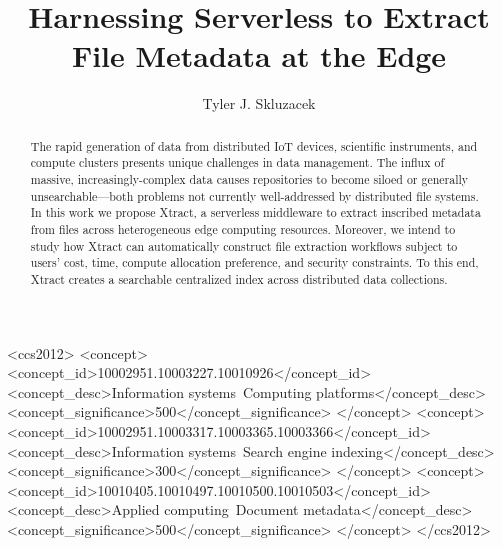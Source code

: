 \documentclass[sigconf, 9pt]{acmart}
\newcommand{\name}{Xtract}
\begin{document}
\title{Harnessing Serverless to Extract File Metadata at the Edge}


\author{Tyler J. Skluzacek} 



\renewcommand{\shortauthors}{Skluzacek et al.}

\begin{abstract}

The rapid generation of data from distributed IoT devices, scientific instruments, and compute clusters presents
unique challenges in data management. The influx of massive, increasingly-complex data causes repositories to become 
siloed or generally unsearchable---both problems not currently well-addressed by distributed file systems.  
In this work we propose \name{}, a serverless middleware 
to extract inscribed metadata from files across heterogeneous edge computing resources. Moreover, we intend to study how \name{} can
automatically construct file extraction workflows subject to users' cost, time, compute allocation preference, and security constraints. 
To this end, \name{} creates a searchable centralized index across distributed data collections.


\end{abstract}

\begin{CCSXML}
<ccs2012>
<concept>
<concept_id>10002951.10003227.10010926</concept_id>
<concept_desc>Information systems~Computing platforms</concept_desc>
<concept_significance>500</concept_significance>
</concept>
<concept>
<concept_id>10002951.10003317.10003365.10003366</concept_id>
<concept_desc>Information systems~Search engine indexing</concept_desc>
<concept_significance>300</concept_significance>
</concept>
<concept>
<concept_id>10010405.10010497.10010500.10010503</concept_id>
<concept_desc>Applied computing~Document metadata</concept_desc>
<concept_significance>500</concept_significance>
</concept>
</ccs2012>
\end{CCSXML}



\maketitle
\end{document}
